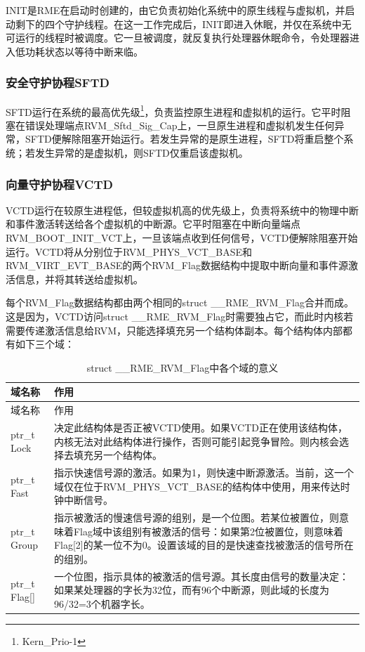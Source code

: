 INIT是RME在启动时创建的，由它负责初始化系统中的原生线程与虚拟机，并启动剩下的四个守护线程。在这一工作完成后，INIT即进入休眠，并仅在系统中无可运行的线程时被调度。它一旦被调度，就反复执行处理器休眠命令，令处理器进入低功耗状态以等待中断来临。

\subsubsection{安全守护协程SFTD}\label{subsubsec:2-1-2-2}

SFTD运行在系统的最高优先级\footnote{Kern\_Prio-1}，负责监控原生进程和虚拟机的运行。它平时阻塞在错误处理端点RVM\_Sftd\_Sig\_Cap上，一旦原生进程和虚拟机发生任何异常，SFTD便解除阻塞开始运行。若发生异常的是原生进程，SFTD将重启整个系统；若发生异常的是虚拟机，则SFTD仅重启该虚拟机。

\subsubsection{向量守护协程VCTD}\label{subsubsec:2-1-2-3}

VCTD运行在较原生进程低，但较虚拟机高的优先级上，负责将系统中的物理中断和事件激活转送给各个虚拟机的中断源。它平时阻塞在中断向量端点RVM\_BOOT\_INIT\_VCT上，一旦该端点收到任何信号，VCTD便解除阻塞开始运行。VCTD将从分别位于RVM\_PHYS\_VCT\_BASE和RVM\_VIRT\_EVT\_BASE的两个RVM\_Flag数据结构中提取中断向量和事件源激活信息，并将其转送给虚拟机。

每个RVM\_Flag数据结构都由两个相同的struct
\_\_RME\_RVM\_Flag合并而成。这是因为，VCTD访问struct
\_\_RME\_RVM\_Flag时需要独占它，而此时内核若需要传递激活信息给RVM，只能选择填充另一个结构体副本。每个结构体内部都有如下三个域：

\begin{xltabular}{\textwidth}{@{}>{\hsize\raggedright\arraybackslash}X>{\hsize\raggedright\arraybackslash}X@{}}
\caption{struct \_\allowbreak{}\_\allowbreak{}RME\_\allowbreak{}RVM\_\allowbreak{}Flag中各个域的意义}\label{tab:2-1}\\
\toprule
域名称 & 作用\tabularnewline
\endfirsthead
\toprule
域名称 & 作用\tabularnewline
\midrule
\endhead
\bottomrule
\endlastfoot
ptr\_\allowbreak{}t Lock &
决定此结构体是否正被VCTD使用。如果VCTD正在使用该结构体，内核无法对此结构体进行操作，否则可能引起竞争冒险。则内核会选择去填充另一个结构体。\tabularnewline
ptr\_\allowbreak{}t Fast &
指示快速信号源的激活。如果为1，则快速中断源激活。当前，这一个域仅在位于RVM\_\allowbreak{}PHYS\_\allowbreak{}VCT\_\allowbreak{}BASE的结构体中使用，用来传达时钟中断信号。\tabularnewline
ptr\_\allowbreak{}t Group &
指示被激活的慢速信号源的组别，是一个位图。若某位被置位，则意味着Flag域中该组别有被激活的信号：如果第2位被置位，则意味着Flag{[}2{]}的某一位不为0。设置该域的目的是快速查找被激活的信号所在的组别。\tabularnewline
ptr\_\allowbreak{}t Flag{[}{]} &
一个位图，指示具体的被激活的信号源。其长度由信号的数量决定：如果某处理器的字长为32位，而有96个中断源，则此域的长度为96/32=3个机器字长。\tabularnewline
\end{xltabular}

